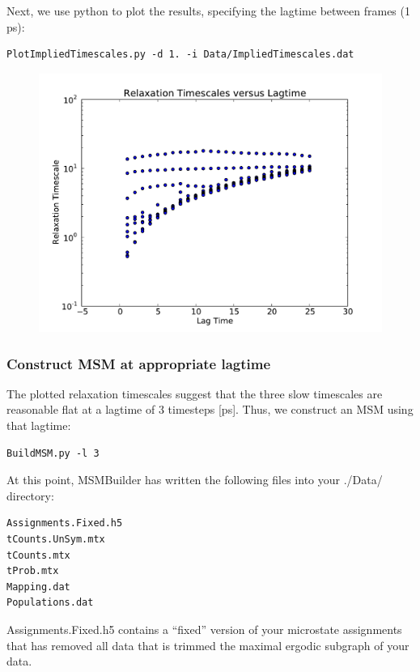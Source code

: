 \documentclass[12pt]{article}
\begin{document}
Next, we use python to plot the results, specifying the lagtime between frames (1 ps):  

\begin{verbatim}
PlotImpliedTimescales.py -d 1. -i Data/ImpliedTimescales.dat
\end{verbatim}

\begin{figure}
\begin{center}
\includegraphics[width=11.7cm]{figures/microstate_timescales.pdf}
\end{center}
\end{figure}

\subsubsection{Construct MSM at appropriate lagtime}
The plotted relaxation timescales suggest that the three slow timescales are reasonable flat at a lagtime of 3 timesteps [ps].  Thus, we construct an MSM using that lagtime:

\begin{verbatim}
BuildMSM.py -l 3 
\end{verbatim}

At this point, MSMBuilder has written the following files into your ./Data/ directory:
\begin{verbatim}
Assignments.Fixed.h5
tCounts.UnSym.mtx
tCounts.mtx
tProb.mtx
Mapping.dat
Populations.dat
\end{verbatim}

Assignments.Fixed.h5 contains a “fixed” version of your microstate assignments that has removed all data that is trimmed the maximal ergodic subgraph of your data.  
\end{document}

